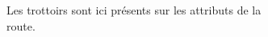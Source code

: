 \begin{figure}[ht]
    \centering
    \begin{subfigure}[t]{.32\linewidth}
        \caption{Les trottoirs sont ici présents sur les attributs  de la route.}
    \end{subfigure}
    \hfill
    \begin{subfigure}[t]{.32\linewidth}

\end{subfigure}
\end{figure}
